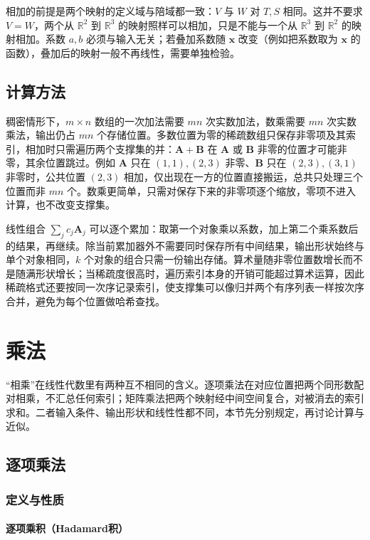 相加的前提是两个映射的定义域与陪域都一致：$V$ 与 $W$ 对 $T,S$ 相同。这并不要求 $V=W$，两个从 $\mathbb R^2$ 到 $\mathbb R^3$ 的映射照样可以相加，只是不能与一个从 $\mathbb R^3$ 到 $\mathbb R^2$ 的映射相加。系数 $a,b$ 必须与输入无关；若叠加系数随 $\bm x$ 改变（例如把系数取为 $\bm x$ 的函数），叠加后的映射一般不再线性，需要单独检验。

\subsection{计算方法}

稠密情形下，$m\times n$ 数组的一次加法需要 $mn$ 次实数加法，数乘需要 $mn$ 次实数乘法，输出仍占 $mn$ 个存储位置。多数位置为零的稀疏数组只保存非零项及其索引，相加时只需遍历两个支撑集的并：$\bm A+\bm B$ 在 $\bm A$ 或 $\bm B$ 非零的位置才可能非零，其余位置跳过。例如 $\bm A$ 只在 $(1,1),(2,3)$ 非零、$\bm B$ 只在 $(2,3),(3,1)$ 非零时，公共位置 $(2,3)$ 相加，仅出现在一方的位置直接搬运，总共只处理三个位置而非 $mn$ 个。数乘更简单，只需对保存下来的非零项逐个缩放，零项不进入计算，也不改变支撑集。

线性组合 $\sum_j c_j\bm A_j$ 可以逐个累加：取第一个对象乘以系数，加上第二个乘系数后的结果，再继续。除当前累加器外不需要同时保存所有中间结果，输出形状始终与单个对象相同，$k$ 个对象的组合只需一份输出存储。算术量随非零位置数增长而不是随满形状增长；当稀疏度很高时，遍历索引本身的开销可能超过算术运算，因此稀疏格式还要按同一次序记录索引，使支撑集可以像归并两个有序列表一样按次序合并，避免为每个位置做哈希查找。

\section{乘法}
\label{sec:ls-multiplication}

“相乘”在线性代数里有两种互不相同的含义。逐项乘法在对应位置把两个同形数配对相乘，不汇总任何索引；矩阵乘法把两个映射经中间空间复合，对被消去的索引求和。二者输入条件、输出形状和线性性都不同，本节先分别规定，再讨论计算与近似。

\subsection{逐项乘法}

\subsubsection{定义与性质}

\paragraph{逐项乘积（Hadamard积）}

